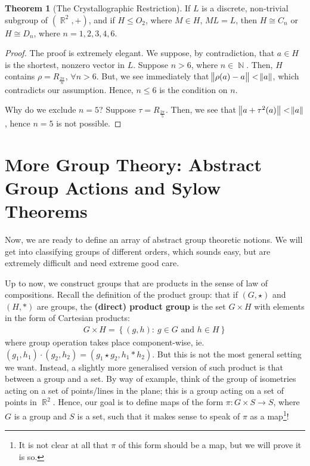 \documentclass[11pt]{amsart} %
\theoremstyle{definition}
\newtheorem{theorem}[definition]{Theorem}
\theoremstyle{definition}
\DeclareMathOperator{\N}{\mathbb{N}}
\DeclareMathOperator{\R}{\mathbb{R}}
\numberwithin{equation}{section}
\newcommand{\condset}[4]{\left\{ #1  : \: #2 #3 #4 \right\}}
\begin{document}
\begin{theorem}[The Crystallographic Restriction]
	\label{thmcrystallographicres}
	If $L$ is a discrete, non-trivial subgroup of $(\R^2,+)$, and if $H \leq O_2$, where $M \in H$, $ML=L$, then $H \cong C_n$ or $H \cong D_n$, where $n=1,2,3,4,6$.
\end{theorem}

\begin{proof}
	The proof is extremely elegant. We suppose, by contradiction, that $a \in H$ is the shortest, nonzero vector in $L$. Suppose $n>6$, where $n \in \N$. Then, $H$ contains $\rho = R_{\frac{2\pi}{n}}$, $\forall n >6$. But, we see immediately that $\norm{\rho (a) - a} < \norm{a}$, which contradicts our assumption. Hence, $n\leq 6$ is the condition on $n$.
	
	Why do we exclude $n=5$? Suppose $\tau = R_{\frac{2\pi}{5}}  $. Then, we see that $\norm{a + \tau^2 (a)} < \norm{a}$, hence $n=5$ is not possible. 
\end{proof}


\clearpage


\section{More Group Theory: Abstract Group Actions and Sylow Theorems}

Now, we are ready to define an array of abstract group theoretic notions. We will get into classifying groups of different orders, which sounds easy, but are extremely difficult and need extreme good care.

Up to now, we construct groups that are products in the sense of law of compositions. Recall the definition of the product group: that if $(G,\star)$ and $(H,\ast)$ are groups, the \textbf{(direct) product group} is the set $G \times H$ with elements in the form of Cartesian products:
\begin{align*}
G \times H = \condset{(g,h)}{g \in G}{ \text{ and }}{h \in H}
\end{align*}
where group operation takes place component-wise, ie. $(g_1,h_1) \cdot (g_2, h_2) = (g_1 \star g_2, h_1 \ast h_2)$. But this is not the most general setting we want. Instead, a slightly more generalised version of such product is that between a group and a set. By way of example, think of the group of isometries acting on a set of points/lines in the plane; this is a group acting on a set of points in $\R^2$. Hence, our goal is to define maps of the form $\pi: G \times S \to S$, where $G$ is a group and $S$ is a set, such that it makes sense to speak of $\pi$ as a map\footnote{It is not clear at all that $\pi$ of this form should be a map, but we will prove it is so.}!
\end{document}
